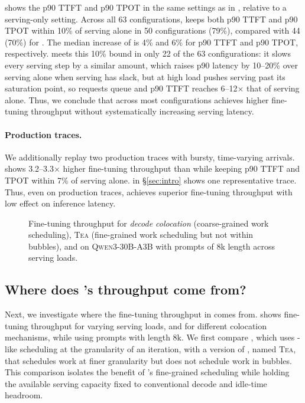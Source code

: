  shows the p90 \ac{TTFT} and p90 \ac{TPOT} in the same settings as in , relative to a serving-only setting.
Across all 63 configurations, \sys keeps both p90 \ac{TTFT} and p90 \ac{TPOT} within 10\% of serving alone in 50 configurations (79\%), compared with 44 (70\%) for \llmstation.
The median increase of \sys is 4\% and 6\% for p90 \ac{TTFT} and p90 \ac{TPOT}, respectively.
\emph{\Uncoord} meets this 10\% bound in only 22 of the 63 configurations: it slows every serving step by a similar amount, which raises p90 latency by 10--20\% over serving alone when serving has slack, but at high load pushes serving past its saturation point, so requests queue and p90 \ac{TTFT} reaches 6--12$\times$ that of serving alone.
Thus, we conclude that \sys across most configurations achieves higher fine-tuning throughput without systematically increasing serving latency.

\paragraph{Production traces.}
We additionally replay two production traces with bursty, time-varying arrivals.
\sys shows 3.2--3.3$\times$ higher fine-tuning throughput than \llmstation while keeping p90 \ac{TTFT} and \ac{TPOT} within 7\% of serving alone.
 in \S\ref{sec:intro} shows one representative trace.
Thus, even on production traces, \sys achieves superior fine-tuning throughput with low effect on inference latency.

\begin{figure}[t]
  \centering
  \caption{Fine-tuning throughput for \emph{decode colocation} (coarse-grained work scheduling), \textsc{Tea} (fine-grained work scheduling but not within bubbles), and \sys on \textsc{Qwen3-30B-A3B} with prompts of 8k length across serving loads.}
  \label{fig:eval-sources}
\end{figure}

\subsection{Where does \sys's throughput come from?}
\label{sec:eval-ablation}

Next, we investigate where the fine-tuning throughput in \sys comes from.
 shows fine-tuning throughput for varying serving loads, and for different colocation mechanisms, while using prompts with length 8k.
We first compare \emph{\cfgColo}, which uses \llmstation-like scheduling at the granularity of an iteration, with a version of \sys, named \textsc{Tea}, that schedules work at finer granularity but does not schedule work in bubbles.
This comparison  isolates the benefit of \sys's fine-grained scheduling while holding the available serving capacity fixed to conventional decode and idle-time headroom.

